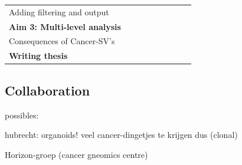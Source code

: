 \documentclass[twoside,fontsize=10pt]{article}
\begin{document}
\begin{table}[h]
\begin{center}
\begin{tabular}{lllllllll}
\hspace*{1em} Adding filtering and output       &                                                 &                                                 &                                                 & \cellcolor[HTML]{656565}                        &                                                 &                                                 &                                                 &                                                 \\
\textbf{Aim 3: Multi-level analysis}            &                                                 &                                                 &                                                 &                                                 & \cellcolor[HTML]{343434}{\color[HTML]{343434} } & \cellcolor[HTML]{343434}{\color[HTML]{343434} } & \cellcolor[HTML]{343434}{\color[HTML]{343434} } & \cellcolor[HTML]{343434}{\color[HTML]{343434} } \\
\hspace*{1em} Consequences of Cancer-SV's       &                                                 &                                                 &                                                 &                                                 & \cellcolor[HTML]{656565}                        & \cellcolor[HTML]{656565}                        & \cellcolor[HTML]{656565}                        & \cellcolor[HTML]{656565}                        \\
\textbf{Writing thesis}                         &                                                 &                                                 &                                                 &                                                 &                                                 &                                                 &                                                 & \cellcolor[HTML]{343434}                       
\end{tabular}
\end{center}
\end{table}


\subsection*{Collaboration}
possibles:

hubrecht: organoids! veel cancer-dingetjes te krijgen dus (clonal)

Horizon-groep (cancer gneomics centre)
\end{document}
